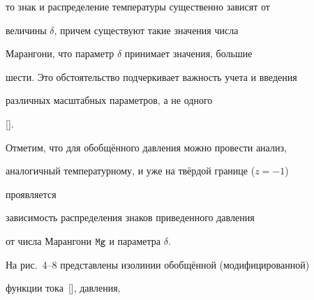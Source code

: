 то знак и распределение температуры существенно зависят от

величины $\delta$, причем существуют такие значения числа

Марангони, что параметр $\delta$ принимает значения, большие

шести. Это обстоятельство подчеркивает важность учета и введения

различных масштабных параметров, а не одного

[].



Отметим, что для обобщённого давления можно провести анализ,

аналогичный температурному, и уже на твёрдой границе ($z=-1$)

проявляется 

%

%

%

%

%












%

%


 зависимость распределения знаков приведенного давления

от числа Марангони ${\tt Mg}$ и параметра $\delta.$











На рис.~4--8 представлены изолинии обобщённой (модифицированной) \linebreak

функции тока~[], давления,

